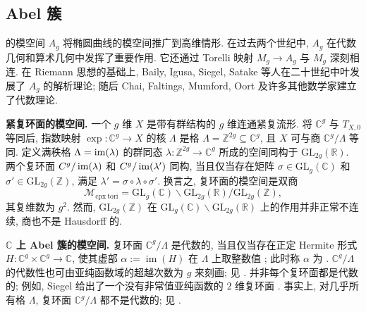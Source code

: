 \subsection{Abel 簇}\label{src:10.1.5-subsection}
的模空间 $A_g$ 将椭圆曲线的模空间推广到高维情形. 在过去两个世纪中, $A_g$ 在代数几何和算术几何中发挥了重要作用. 它还通过 Torelli 映射 $M_g\to A_g$ 与 $M_g$ 深刻相连. 在 Riemann 思想的基础上, Baily, Igusa, Siegel, Satake 等人在二十世纪中叶发展了 $A_g$ 的解析理论; 随后 Chai, Faltings, Mumford, Oort 及许多其他数学家建立了代数理论.

\textbf{紧复环面的模空间.} 一个 $g$ 维 $X$ 是带有群结构的 $g$ 维连通紧复流形. 将 $\mathbb C^g$ 与 $T_{X,0}$ 等同后, 指数映射 $\exp:\mathbb C^g\to X$ 的核 $\Lambda$ 是格 $\Lambda=\mathbb Z^{2g}\subseteq\mathbb C^g$, 且 $X$ 可与商 $\mathbb C^g/\Lambda$ 等同. 定义满秩格 $\Lambda=\operatorname{im}(\lambda)$ 的群同态 $\lambda:\mathbb Z^{2g}\to\mathbb C^g$ 所成的空间同构于 $\mathrm{GL}_{2g}(\mathbb R)$. 两个复环面 $C^g/\operatorname{im}(\lambda)$ 和 $C^g/\operatorname{im}(\lambda')$ 同构, 当且仅当存在矩阵 $\sigma\in\mathrm{GL}_g(\mathbb C)$ 和 $\sigma'\in\mathrm{GL}_{2g}(\mathbb Z)$, 满足 $\lambda'=\sigma\circ\lambda\circ\sigma'$. 换言之, 复环面的模空间是双商
\[
\mathcal M_{\mathrm{cpx\ tori}}=\mathrm{GL}_g(\mathbb C)\backslash\mathrm{GL}_{2g}(\mathbb R)/\mathrm{GL}_{2g}(\mathbb Z),
\]
其复维数为 $g^2$. 然而, $\mathrm{GL}_{2g}(\mathbb Z)$ 在 $\mathrm{GL}_g(\mathbb C)\backslash\mathrm{GL}_{2g}(\mathbb R)$ 上的作用并非正常不连续, 商也不是 Hausdorff 的.

\textbf{\texorpdfstring{$\mathbb C$}{C} 上 Abel 簇的模空间.} 复环面 $\mathbb C^g/\Lambda$ 是代数的, 当且仅当存在正定 Hermite 形式 $H:\mathbb C^g\times\mathbb C^g\to\mathbb C$, 使其虚部 $\alpha:=\operatorname{im}(H)$ 在 $\Lambda$ 上取整数值 \cite{Rie57}; 此时称 $\alpha$ 为 . $\mathbb C^g/\Lambda$ 的代数性也可由亚纯函数域的超越次数为 $g$ 来刻画; 见 \cite[第 35 页推论]{Mum70a}. 并非每个复环面都是代数的; 例如, Siegel 给出了一个没有非常值亚纯函数的 $2$ 维复环面 \cite[第 104 页]{Sie50}. 事实上, 对几乎所有格 $\Lambda$, 复环面 $\mathbb C^g/\Lambda$ 都不是代数的; 见 \cite[第 37 页引理]{Mum70a}.

